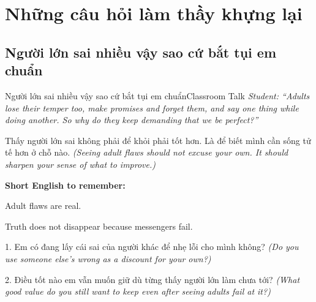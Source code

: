 \chapter{Những câu hỏi làm thầy khựng lại}

\section{Người lớn sai nhiều vậy sao cứ bắt tụi em chuẩn}
\begin{truyen}{Người lớn sai nhiều vậy sao cứ bắt tụi em chuẩn}{Classroom Talk}
\textit{Student: ``Adults lose their temper too, make promises and forget them, and say one thing while doing another. So why do they keep demanding that we be perfect?''}\\[4pt]



\end{truyen}

\begin{baihoc}
Thấy người lớn sai không phải để khỏi phải tốt hơn. Là để biết mình cần sống tử tế hơn ở chỗ nào.
\textit{(Seeing adult flaws should not excuse your own. It should sharpen your sense of what to improve.)}
\end{baihoc}

\begin{ghinhoanh}
\textbf{Short English to remember:}

Adult flaws are real.

Truth does not disappear because messengers fail.
\end{ghinhoanh}

\begin{tuhocnhanh}
1. Em có đang lấy cái sai của người khác để nhẹ lỗi cho mình không? \textit{(Do you use someone else’s wrong as a discount for your own?)}

2. Điều tốt nào em vẫn muốn giữ dù từng thấy người lớn làm chưa tới? \textit{(What good value do you still want to keep even after seeing adults fail at it?)}
\end{tuhocnhanh}
\ngancach

